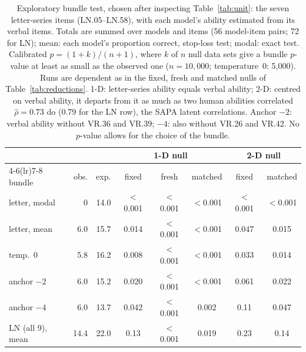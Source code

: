 \begin{table}[t]
\caption{Exploratory bundle test, chosen after inspecting Table~\ref{tab:unit}: the seven letter-series items (LN.05--LN.58), with each model's ability estimated from its verbal items. Totals are summed over models and items (56 model-item pairs; 72 for LN); mean: each model's proportion correct, stop-loss test; modal: exact test. Calibrated $p=(1+k)/(n+1)$, where $k$ of $n$ null data sets give a bundle $p$-value at least as small as the observed one ($n=10{,}000$; temperature~0: 5{,}000). Runs are dependent as in the fixed, fresh and matched nulls of Table~\ref{tab:reductions}. 1-D: letter-series ability equals verbal ability; 2-D: centred on verbal ability, it departs from it as much as two human abilities correlated $\hat\rho=0.73$ do (0.79 for the LN row), the SAPA latent correlations. Anchor $-2$: verbal ability without VR.36 and VR.39; $-4$: also without VR.26 and VR.42. No $p$-value allows for the choice of the bundle.}
\label{tab:bundle}\centering\footnotesize\setlength{\tabcolsep}{2pt}
\begin{tabular}{lrrccccc}\toprule
 & & & \multicolumn{3}{c}{1-D null} & \multicolumn{2}{c}{2-D null} \\\cmidrule(lr){4-6}\cmidrule(lr){7-8}
bundle & obs. & exp. & fixed & fresh & matched & fixed & matched \\\midrule
letter, modal & 0 & 14.0 & $<$0.001 & $<$0.001 & $<$0.001 & $<$0.001 & $<$0.001 \\
letter, mean & 6.0 & 15.7 & 0.014 & $<$0.001 & $<$0.001 & 0.047 & 0.015 \\
\quad temp.\ 0 & 5.8 & 16.2 & 0.008 & $<$0.001 & $<$0.001 & 0.033 & 0.014 \\
\quad anchor $-2$ & 6.0 & 15.2 & 0.020 & $<$0.001 & $<$0.001 & 0.061 & 0.022 \\
\quad anchor $-4$ & 6.0 & 13.7 & 0.042 & $<$0.001 & 0.002 & 0.11 & 0.047 \\
LN (all 9), mean & 14.4 & 22.0 & 0.13 & $<$0.001 & 0.019 & 0.23 & 0.14 \\
\bottomrule\end{tabular}\end{table}
